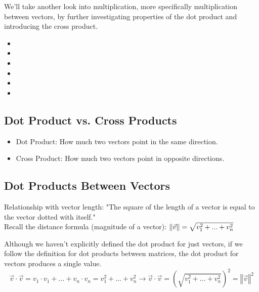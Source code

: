 
We'll take another look into multiplication, more specifically multiplication between vectors, by further investigating properties of the dot product and introducing the cross product.

\begin{itemize}
	\item {}
	\item {}
	\item {}
	\item {}
	\item {}
	\item {}
\end{itemize}


\subsection{Dot Product vs. Cross Products}\label{concept2.1}

\begin{itemize}
	\item Dot Product: How much two vectors point in the same direction.
	\item Cross Product: How much two vectors point in opposite directions.
\end{itemize}


\subsection{Dot Products Between Vectors}\label{concept2.2}
Relationship with vector length: "The square of the length of a vector is equal to the vector dotted with itself."
\\

Recall the distance formula (magnitude of a vector): $\left\Vert \vec{v} \right\Vert = \sqrt{v_{1}^{2} + ... + v_{n}^{2}}$

Although we haven't explicitly defined the dot product for just vectors, if we follow the definition for dot products between matrices, the dot product for vectors produces a single value.
\\
\begin{equation}
	\vec{v} \cdot \vec{v}  = v_1 \cdot v_1 + . . . + v_n \cdot v_n = v_1^2 + . . . + v_n^2
	\longrightarrow
	\vec{v} \cdot \vec{v} = \left(\sqrt{v_1^2 + . . . + v_n^2}\right)^2 = \left\Vert \vec{v} \right\Vert^2
\end{equation}

